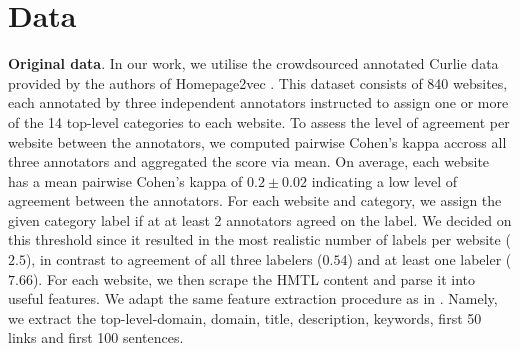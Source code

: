 

\section{Data}

\textbf{Original data}. In our work, we utilise the crowdsourced annotated Curlie data provided by the authors of Homepage2vec \cite{homepage2vec}. 
This dataset consists of 840 websites, each annotated by three independent annotators instructed to assign one or more of the 14 top-level categories to each website. To assess the level of agreement per website between the annotators, we computed pairwise Cohen's kappa \cite{cohen-coef} accross all three
annotators and aggregated the score via mean. On average, each website has a mean pairwise Cohen's kappa of $0.2 \pm 0.02$ indicating a low level of agreement between the annotators. For each website and category, we assign the given category label if at at least 2 annotators agreed on the label. We decided on this threshold since it resulted in the most realistic number of labels per website ($2.5$), in contrast to agreement of all three labelers ($0.54$) and at least one labeler ($7.66$). For each website, we then scrape the HMTL content and parse it into useful features. We adapt the same feature extraction procedure as in \cite{homepage2vec}. Namely, we extract the top-level-domain, domain, title, description, keywords, first 50 links and first 100 sentences.



